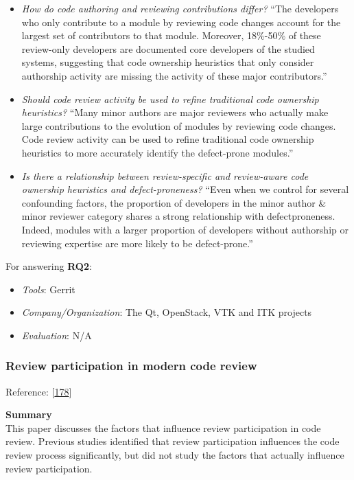 \documentclass[]{book}
\providecommand{\tightlist}{%
  \setlength{\itemsep}{0pt}\setlength{\parskip}{0pt}}
\begin{document}
\begin{itemize}
\item
  \emph{How do code authoring and reviewing contributions differ?} ``The
  developers who only contribute to a module by reviewing code changes
  account for the largest set of contributors to that module. Moreover,
  18\%-50\% of these review-only developers are documented core
  developers of the studied systems, suggesting that code ownership
  heuristics that only consider authorship activity are missing the
  activity of these major contributors.''
\item
  \emph{Should code review activity be used to refine traditional code
  ownership heuristics?} ``Many minor authors are major reviewers who
  actually make large contributions to the evolution of modules by
  reviewing code changes. Code review activity can be used to refine
  traditional code ownership heuristics to more accurately identify the
  defect-prone modules.''
\item
  \emph{Is there a relationship between review-specific and review-aware
  code ownership heuristics and defect-proneness?} ``Even when we
  control for several confounding factors, the proportion of developers
  in the minor author \& minor reviewer category shares a strong
  relationship with defectproneness. Indeed, modules with a larger
  proportion of developers without authorship or reviewing expertise are
  more likely to be defect-prone.''
\end{itemize}

For answering \textbf{RQ2}:

\begin{itemize}
\tightlist
\item
  \emph{Tools}: Gerrit
\item
  \emph{Company/Organization}: The Qt, OpenStack, VTK and ITK projects
\item
  \emph{Evaluation}: N/A
\end{itemize}

\subsubsection{Review participation in modern code
review}\label{review-participation-in-modern-code-review}

Reference: {[}\protect\hyperlink{ref-thongtanunam2017review}{178}{]}

\textbf{Summary}\\
This paper discusses the factors that influence review participation in
code review. Previous studies identified that review participation
influences the code review process significantly, but did not study the
factors that actually influence review participation.
\end{document}
